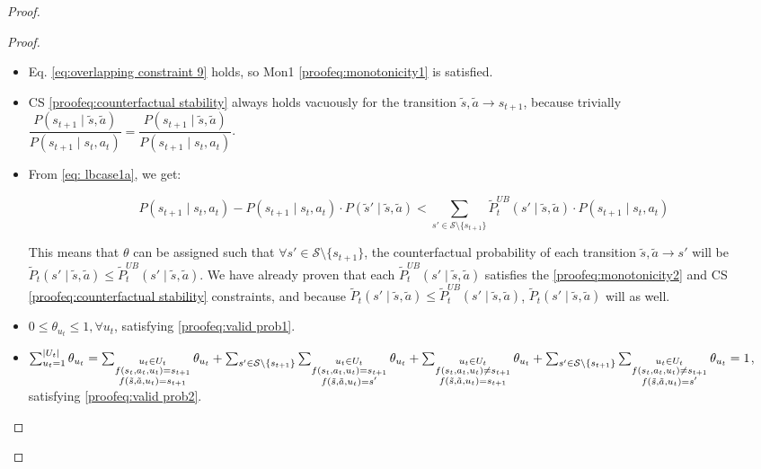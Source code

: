 \begin{proof}
\begin{proof}
\begin{itemize}
    \item Eq. \eqref{eq:overlapping constraint 9} holds, so Mon1 \eqref{proofeq:monotonicity1} is satisfied. 
    
    \item CS \eqref{proofeq:counterfactual stability} always holds vacuously for the transition $\tilde{s}, \tilde{a} \rightarrow s_{t+1}$, because trivially $\dfrac{P(s_{t+1} \mid \tilde{s}, \tilde{a})}{P(s_{t+1} \mid s_t, a_t)} = \dfrac{P(s_{t+1} \mid \tilde{s}, \tilde{a})}{P(s_{t+1} \mid s_t, a_t)}$. 
    
    \item From \eqref{eq: lbcase1a}, we get:

    \[
    P(s_{t+1} \mid s_t, a_t) - P(s_{t+1} \mid s_t, a_t) \cdot P(\tilde{s}' \mid \tilde{s}, \tilde{a}) < \sum_{s' \in \mathcal{S}\setminus\{s_{t+1}\}}{\tilde{P}_{t}^{UB}(s' \mid \tilde{s}, \tilde{a})} \cdot P(s_{t+1} \mid s_t, a_t)
    \]

    This means that $\theta$ can be assigned such that $\forall s' \in \mathcal{S}\setminus\{s_{t+1}\}$, the counterfactual probability of each transition $\tilde{s}, \tilde{a} \rightarrow s'$ will be $\tilde{P}_t(s' \mid \tilde{s}, \tilde{a}) \leq \tilde{P}_{t}^{UB}(s' \mid \tilde{s}, \tilde{a})$. We have already proven that each $\tilde{P}_{t}^{UB}(s' \mid \tilde{s}, \tilde{a})$ satisfies the \eqref{proofeq:monotonicity2} and CS \eqref{proofeq:counterfactual stability} constraints, and because $\tilde{P}_t(s' \mid \tilde{s}, \tilde{a}) \leq \tilde{P}_{t}^{UB}(s' \mid \tilde{s}, \tilde{a})$, $\tilde{P}_t(s'\mid \tilde{s}, \tilde{a})$ will as well.

    \item $0 \leq \theta_{u_t} \leq 1, \forall u_t$, satisfying \eqref{proofeq:valid prob1}.
    
    \item $\sum_{u_t = 1}^{|U_t|} \theta_{u_t} = \sum_{\substack{u_t \in U_t \\f(s_t, a_t, u_t) = s_{t+1} \\ f(\tilde{s}, \tilde{a}, u_t) = s_{t+1}}} \theta_{u_t} +  \sum_{s' \in \mathcal{S}\setminus\{ s_{t+1}\}}\sum_{\substack{u_t \in U_t \\f(s_t, a_t, u_t) = s_{t+1} \\ f(\tilde{s}, \tilde{a}, u_t) = s'}}{\theta_{u_t}} + \sum_{\substack{u_t \in U_t \\f(s_t, a_t, u_t) \neq s_{t+1} \\ f(\tilde{s}, \tilde{a}, u_t) = s_{t+1}}} \theta_{u_t} \\+ \sum_{s' \in \mathcal{S}\setminus\{ s_{t+1}\}}\sum_{\substack{u_t \in U_t \\f(s_t, a_t, u_t) \neq s_{t+1} \\ f(\tilde{s}, \tilde{a}, u_t) = s'}}{\theta_{u_t}} = 1$, satisfying \eqref{proofeq:valid prob2}.
\end{itemize}


\end{proof}
\end{proof}
